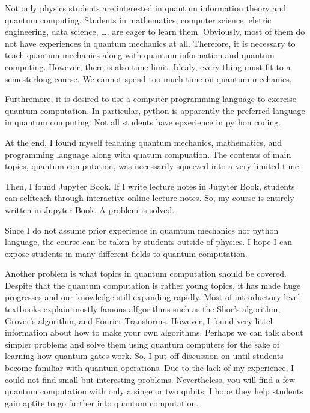 \documentclass[letterpaper,10pt,english]{jupyterBook}
\begin{document}
\sphinxAtStartPar
Not only physics students are interested in quantum information theory and quantum computing.   Students in mathematics, computer science, eletric engineering, data science, …. are eager to learn them.  Obviously, most of them do not have experiences in quantum mechanics at all.  Therefore, it is necessary to teach quantum mechanics along with quantum information and quantum computing.  However, there is also time limit.  Idealy, every thing must fit to a semester\sphinxhyphen{}long course. We cannot spend too much time on quantum mechanics.

\sphinxAtStartPar
Furthremore, it is desired to use a computer programming language to exercise quantum computation.  In particular, python is apparently the preferred language in quantum computing.  Not all students have epxerience in python coding.

\sphinxAtStartPar
At the end, I found myself teaching quantum mechanics, mathematics, and programming language along with quatum compuation.  The contents of main topics, quantum computation, was necessarily squeezed into a very limited time.

\sphinxAtStartPar
Then, I found Jupyter Book.  If I write lecture notes in Jupyter Book, students can self\sphinxhyphen{}teach  through interactive online lecture notes.  So, my course is entirely written in Jupyter Book.  A problem is solved.

\sphinxAtStartPar
Since I do not assume prior experience in quamtum mechanics nor python language, the course can be taken by students outside of physics. I hope I can expose students in many different fields to quantum computation.

\sphinxAtStartPar
Another problem is what topics in quantum computation should be covered.  Despite that the quantum computation is rather young topics, it has made huge progresses and our knowledge still expanding rapidly.  Most of introductory level textbooks explain mostly famous alfgorithms such as the Shor’s algorithm, Grover’s algorithm, and Fourier Transforms.  However, I found very littel information about how to make your own algorithms.  Perhaps we can talk about simpler problems and solve them using quantum computers for the sake of learning how quantum gates work.  So, I put off discussion on  until students become familiar with quantum operations.  Due to the lack of my experience, I could not find small but interesting problems.  Nevertheless, you will find a few quantum computation with only a singe or two qubits.  I hope they help students gain
aptite to go further into quantum computation.
\end{document}
